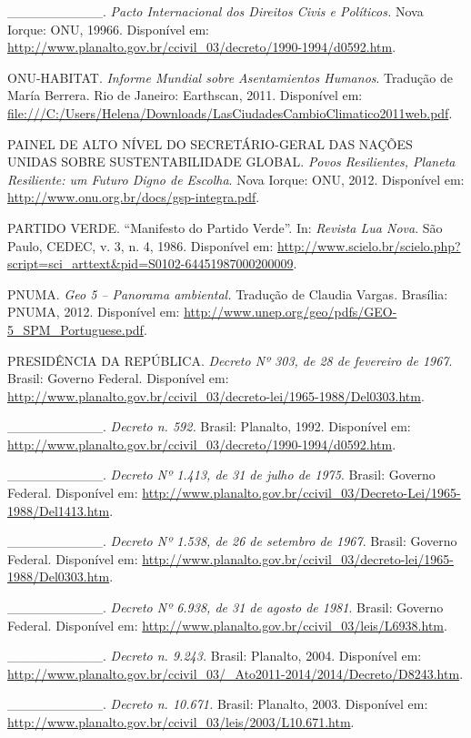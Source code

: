 \_\_\_\_\_\_\_\_\_\_. \emph{Pacto Internacional dos Direitos Civis e
Políticos.} Nova Iorque: ONU, 19966. Disponível em:
\url{http://www.planalto.gov.br/ccivil_03/decreto/1990-1994/d0592.htm}.

ONU-HABITAT. \emph{Informe Mundial sobre Asentamientos Humanos}.
Tradução de María Berrera. Rio de Janeiro: Earthscan, 2011. Disponível
em:
\url{file:///C:/Users/Helena/Downloads/LasCiudadesCambioClimatico2011web.pdf}.

PAINEL DE ALTO NÍVEL DO SECRETÁRIO-GERAL DAS NAÇÕES UNIDAS SOBRE
SUSTENTABILIDADE GLOBAL. \emph{Povos Resilientes, Planeta Resiliente: um
Futuro Digno de Escolha}. Nova Iorque: ONU, 2012. Disponível em: { }
\url{http://www.onu.org.br/docs/gsp-integra.pdf}.

PARTIDO VERDE. ``Manifesto do Partido Verde''. In: \emph{Revista Lua
Nova}. São Paulo, CEDEC, v. 3, n. 4, 1986. Disponível em:
\url{http://www.scielo.br/scielo.php?script=sci_arttext\&pid=S0102-64451987000200009}.

PNUMA. \emph{Geo 5 -- Panorama ambiental.} Tradução de Claudia Vargas.
Brasília: PNUMA, 2012. Disponível em:
\url{http://www.unep.org/geo/pdfs/GEO-5_SPM_Portuguese.pdf}.

PRESIDÊNCIA DA REPÚBLICA. \emph{Decreto Nº 303, de 28 de fevereiro de
1967}. Brasil: Governo Federal. Disponível em:
\url{http://www.planalto.gov.br/ccivil_03/decreto-lei/1965-1988/Del0303.htm}.

\_\_\_\_\_\_\_\_\_\_. \emph{Decreto n. 592.} Brasil: Planalto, 1992.
Disponível em:
\url{http://www.planalto.gov.br/ccivil_03/decreto/1990-1994/d0592.htm}.

\_\_\_\_\_\_\_\_\_\_. \emph{Decreto Nº 1.413, de 31 de julho de 1975}.
Brasil: Governo Federal. Disponível em:
\url{http://www.planalto.gov.br/ccivil_03/Decreto-Lei/1965-1988/Del1413.htm}.

\_\_\_\_\_\_\_\_\_\_. \emph{Decreto Nº 1.538, de 26 de setembro de
1967}. Brasil: Governo Federal. Disponível em:
\url{http://www.planalto.gov.br/ccivil_03/decreto-lei/1965-1988/Del0303.htm}.

\_\_\_\_\_\_\_\_\_\_. \emph{Decreto Nº 6.938, de 31 de agosto de 1981}.
Brasil: Governo Federal. Disponível em:
\url{http://www.planalto.gov.br/ccivil_03/leis/L6938.htm}.

\_\_\_\_\_\_\_\_\_\_. \emph{Decreto n. 9.243.} Brasil: Planalto, 2004.
Disponível em:
\url{http://www.planalto.gov.br/ccivil_03/_Ato2011-2014/2014/Decreto/D8243.htm}.

\_\_\_\_\_\_\_\_\_\_. \emph{Decreto n. 10.671.} Brasil: Planalto, 2003.
Disponível em:
\url{http://www.planalto.gov.br/ccivil_03/leis/2003/L10.671.htm}.

